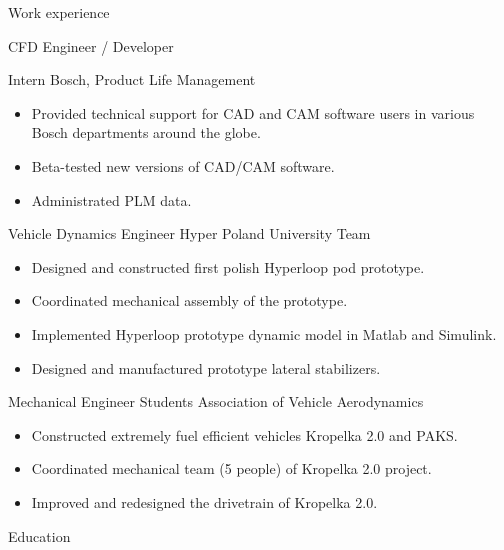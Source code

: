 \documentclass[a4paper, 10pt]{article}
\def \addspace {0.0em}
\begin{document}
{\begin{cvsection}{Work experience}
\begin{entry}{CFD Engineer / Developer}{\hfill {}}
\begin{itemize}
      \end{itemize}
    \end{entry}
    \vspace{\addspace}
    \begin{entry}{Intern}{\hfill {}}
      Bosch, Product Life Management
      \begin{itemize}
        \item Provided technical support for CAD and CAM software users in various Bosch departments around the globe.
        \item Beta-tested new versions of CAD/CAM software.
        \item Administrated PLM data.
      \end{itemize}
    \end{entry}
    \vspace{\addspace}
    \begin{entry}{Vehicle Dynamics Engineer}{\hfill {}}
      Hyper Poland University Team
      \begin{itemize}
        \item Designed and constructed first polish Hyperloop pod prototype.
        \item Coordinated mechanical assembly of the prototype.
        \item Implemented Hyperloop prototype dynamic model in Matlab and Simulink.
        \item Designed and manufactured prototype lateral stabilizers.
      \end{itemize}
    \end{entry}
    \vspace{\addspace}
    \begin{entry}{Mechanical Engineer}{\hfill {}}
      Students Association of Vehicle Aerodynamics
      \begin{itemize}
        \item Constructed extremely fuel efficient vehicles Kropelka 2.0 and PAKS.
        \item Coordinated mechanical team (5 people) of Kropelka 2.0 project.
        \item Improved and redesigned the drivetrain of Kropelka 2.0.
      \end{itemize}
    \end{entry}
  \end{cvsection}
}{%
  \begin{cvsection}{Education}

\end{cvsection}}
\end{document}
